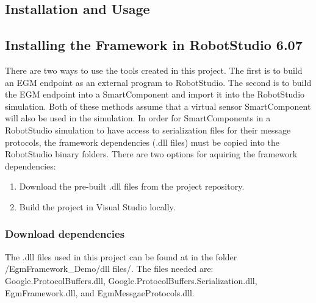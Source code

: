 \documentclass{cslthse-msc}
\begin{document}
\begin{appendices}


\chapter{Installation and Usage}
\label{app:Install_Use}

\section{Installing the Framework in RobotStudio 6.07}
\label{app:Install_Use:RobotStudio}
There are two ways to use the tools created in this project. The first is to build an EGM endpoint as an external program to RobotStudio. The second is to build the EGM endpoint into a SmartComponent and import it into the RobotStudio simulation. Both of these methods assume that a virtual sensor SmartComponent will also be used in the simulation. In order for SmartComponents in a RobotStudio simulation to have access to serialization files for their message protocols, the framework dependencies (.dll files) must be copied into the RobotStudio binary folders. There are two options for aquiring the framework dependencies:
\begin{enumerate}
    \item Download the pre-built .dll files from the project repository.
    \item Build the project in Visual Studio locally.
\end{enumerate}

\subsection{Download dependencies}
\label{app:Install_Use:RobotStudio:download}
The .dll files used in this project can be found at \cite{Greg:Ref_Repo} in the folder /EgmFramework\_Demo/dll files/. The files needed are: Google.ProtocolBuffers.dll, Google.ProtocolBuffers.Serialization.dll, EgmFramework.dll, and EgmMessgaeProtocols.dll. 


\end{appendices}
\end{document}
